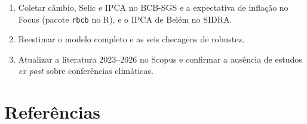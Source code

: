 \documentclass[11pt,a4paper]{article}
\begin{document}
\begin{enumerate}[leftmargin=*]
  \item Coletar câmbio, Selic e IPCA no BCB-SGS e a expectativa de inflação no Focus (pacote
        \texttt{rbcb} no R), e o IPCA de Belém no SIDRA.
  \item Reestimar o modelo completo e as seis checagens de robustez.
  \item Atualizar a literatura 2023--2026 no Scopus e confirmar a ausência de estudos \textit{ex post}
        sobre conferências climáticas.
\end{enumerate}

\section*{Referências}
\end{document}
